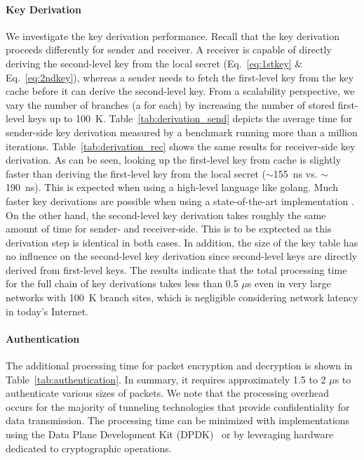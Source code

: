 \paragraph{Key Derivation}
We investigate the key derivation performance. Recall that the key derivation proceeds
differently for sender and receiver. A receiver is capable of directly deriving the
second-level key from the local secret (Eq.~\ref{eq:1stkey} \& Eq.~\ref{eq:2ndkey}),
whereas a sender needs to fetch the first-level key from the key cache before it can derive the second-level key.
From a scalability perspective, we vary the number of branches (a \tp for each) by increasing the number of stored
first-level keys up to \SI{100}{K}. Table~\ref{tab:derivation_send} depicts the average time for sender-side key derivation
measured by a benchmark running more than a million iterations. Table~\ref{tab:derivation_rec} shows the same results for
receiver-side key derivation. As can be seen, looking up the first-level key from cache is slightly faster than
deriving the first-level key from the local secret ($\sim$\SI{155}{ns} vs. $\sim$\SI{190}{ns}).
This is expected when using a high-level language like golang.
Much faster key derivations are possible when using a state-of-the-art implementation \cite{rot2020piskes}.
On the other hand, the second-level key derivation takes roughly the same amount of time for sender- and receiver-side.
This is to be exptected as this derivation step is identical in both cases. In addition, the size of the key table
has no influence on the second-level key derivation since second-level keys are directly derived from first-level keys.
The results indicate that the total processing time for the full chain of key derivations takes less than 0.5 $\mu$s
even in very large networks with \SI{100}{K} branch sites, which is negligible considering
network latency in today's Internet.

\paragraph{Authentication}
The additional processing time for packet encryption and decryption is shown in
Table~\ref{tab:authentication}. In summary, it requires approximately 1.5 to 2 $\mu$s to
authenticate various sizes of packets. We note that the processing overhead occurs for the majority
of tunneling technologies that provide confidentiality for data transmission. The processing
time can be minimized with implementations using the Data Plane Development Kit
(DPDK)~\cite{dpdk} or by leveraging hardware dedicated to cryptographic
operations.

